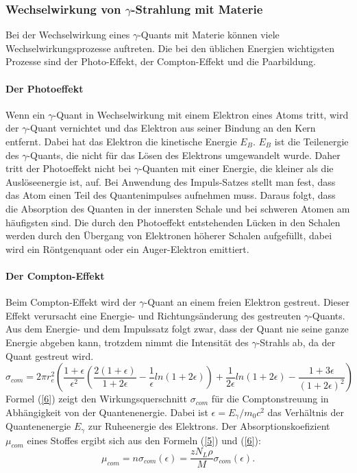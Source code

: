 \documentclass[11pt,ngerman,a4paper]{article}
\begin{document}
\subsubsection{Wechselwirkung von $\gamma$-Strahlung mit Materie}
Bei der Wechselwirkung eines $\gamma$-Quants mit Materie können viele Wechselwirkungsprozesse auftreten. Die bei den üblichen Energien wichtigsten Prozesse sind der Photo-Effekt, der Compton-Effekt und die Paarbildung.
\paragraph{Der Photoeffekt}
Wenn ein $\gamma$-Quant in Wechselwirkung mit einem Elektron eines Atoms tritt, wird der $\gamma$-Quant vernichtet und das Elektron aus seiner Bindung an den Kern entfernt. Dabei hat das Elektron die kinetische Energie $E_B$. $E_B$ ist die Teilenergie des $\gamma$-Quants, die nicht für das Lösen des Elektrons umgewandelt wurde. Daher tritt der Photoeffekt nicht bei $\gamma$-Quanten mit einer Energie, die kleiner als die Auslöseenergie ist, auf. Bei Anwendung des Impuls-Satzes stellt man fest, dass das Atom einen Teil des Quantenimpulses aufnehmen muss. Daraus folgt, dass die Absorption des Quanten in der innersten Schale und bei schweren Atomen am häufigsten sind. Die durch den Photoeffekt entstehenden Lücken in den Schalen werden durch den Übergang von Elektronen höherer Schalen aufgefüllt, dabei wird ein Röntgenquant oder ein Auger-Elektron emittiert.
\paragraph{Der Compton-Effekt}
Beim Compton-Effekt wird der $\gamma$-Quant an einem freien Elektron gestreut. Dieser Effekt verursacht eine Energie- und Richtungsänderung des gestreuten $\gamma$-Quants. Aus dem Energie- und dem Impulssatz folgt zwar, dass der Quant nie seine ganze Energie abgeben kann, trotzdem nimmt die Intensität des $\gamma$-Strahls ab, da der Quant gestreut wird.
\begin{equation}
\sigma_{com} = 2\pi r_e^2\left(\frac{1+\epsilon}{\epsilon^2} \left( \frac{2(1+\epsilon)}{1+2\epsilon}-\frac{1}{\epsilon}ln(1+2\epsilon) \right) + \frac{1}{2\epsilon}ln(1+2\epsilon) - \frac{1+3\epsilon}{(1+2\epsilon)^2} \right)
\label{6}
\end{equation}
Formel (\ref{6}) zeigt den Wirkungsquerschnitt $\sigma_{com}$ für die Comptonstreuung in Abhängigkeit von der Quantenenergie. Dabei ist $\epsilon = E_{\gamma} / m_0c^2$ das Verhältnis der Quantenenergie $E_{\gamma}$ zur Ruheenergie des Elektrons. Der Absorptionskoefizient  $\mu_{com}$ eines Stoffes ergibt sich aus den Formeln (\ref{5}) und (\ref{6}):
\begin{equation}
\mu_{com} = n\sigma_{com}(\epsilon) = \frac{zN_L\rho}{M}\sigma_{com}(\epsilon).
\label{7}
\end{equation}
\end{document}
